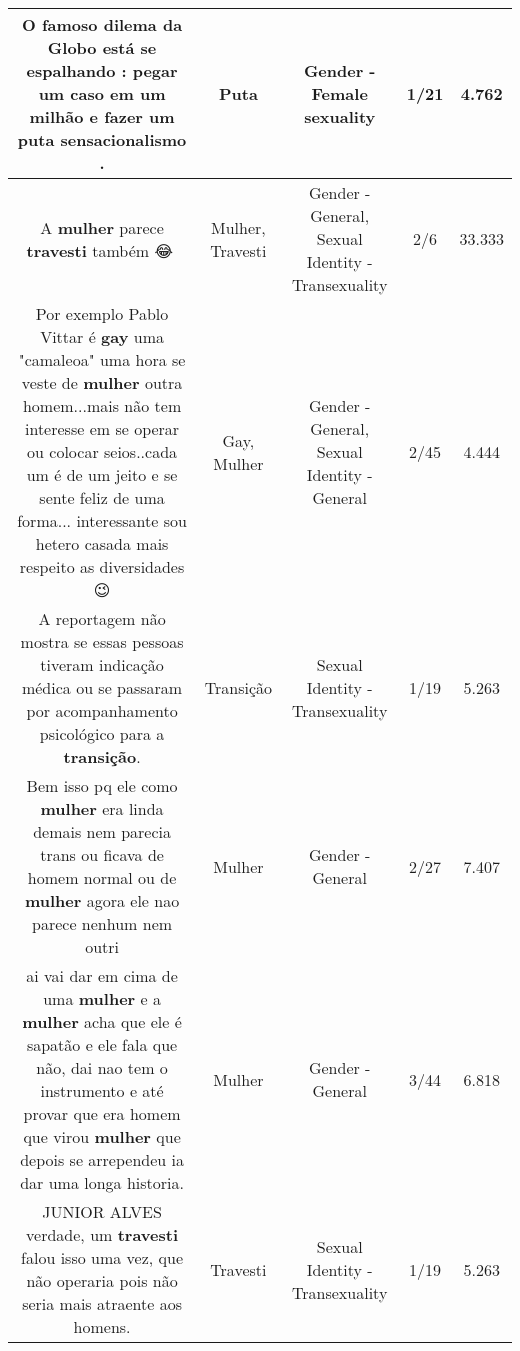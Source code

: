 \documentclass[11pt]{article}
\newlength\mylength
\begin{document}
\begin{center}
\begin{longtable}{|C{.65\mylength}|C{.30\mylength}|C{.12\mylength}|C{.12\mylength}|C{.12\mylength}|}
  \small O famoso dilema da Globo está se espalhando : pegar um caso em um milhão e fazer um \textbf{puta} sensacionalismo .\normalsize   & Puta & Gender - Female sexuality & 1/21 & 4.762 \\  \hline
  \small A \textbf{mulher} parece \textbf{travesti} também 😂🤣\normalsize   & Mulher, Travesti & Gender - General, Sexual Identity - Transexuality & 2/6 & 33.333 \\  \hline
  \small Por exemplo Pablo Vittar é \textbf{gay} uma "camaleoa" uma hora se veste de \textbf{mulher} outra homem...mais não tem interesse em se operar ou colocar seios..cada um é de um jeito e se sente feliz de uma forma... interessante sou hetero casada mais respeito as diversidades😉\normalsize   & Gay, Mulher & Gender - General, Sexual Identity - General & 2/45 & 4.444 \\  \hline
  \small A reportagem não mostra se essas pessoas tiveram indicação médica ou se passaram por acompanhamento psicológico para a \textbf{transição}.\normalsize   & Transição & Sexual Identity - Transexuality & 1/19 & 5.263 \\  \hline
  \small Bem isso pq ele como \textbf{mulher} era linda demais nem parecia trans ou ficava de homem normal ou de \textbf{mulher} agora ele nao parece nenhum nem outri\normalsize   & Mulher & Gender - General & 2/27 & 7.407 \\  \hline
  \small ai vai dar em cima de uma \textbf{mulher} e a \textbf{mulher} acha que ele é sapatão e ele fala que não, dai nao tem o instrumento e até provar que era homem que virou \textbf{mulher} que depois se arrependeu ia dar uma longa historia.\normalsize   & Mulher & Gender - General & 3/44 & 6.818 \\  \hline
  \small JUNIOR ALVES verdade, um \textbf{travesti} falou isso uma vez, que não operaria pois não seria mais atraente aos homens.\normalsize   & Travesti & Sexual Identity - Transexuality & 1/19 & 5.263 \\  \hline

\end{longtable}
\end{center}
\end{document}
